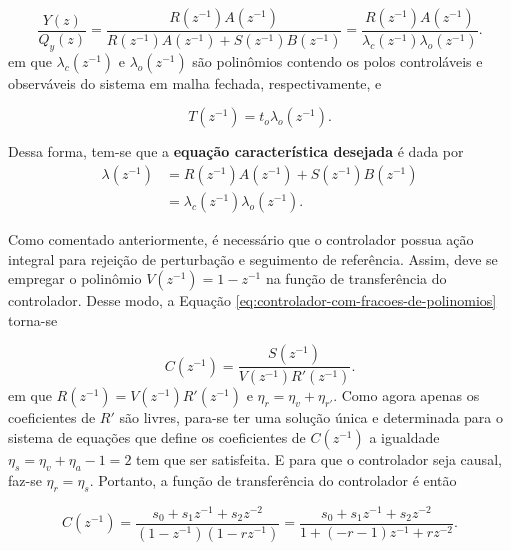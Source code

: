 \begin{equation}
    \label{eq:ft-da-saida-para-perturbacao-na-saida}
    \frac{Y(z)}{Q_{y}(z)} = \frac{R(z^{-1})A(z^{-1})}
                                 {R(z^{-1})A(z^{-1})+S(z^{-1})B(z^{-1})}
                          = \frac{R(z^{-1})A(z^{-1})}
                                 {\lambda_{c}(z^{-1})\lambda_{o}(z^{-1})}.
\end{equation} em que $\lambda_{c}(z^{-1})$ e $\lambda_{o}(z^{-1})$ são polinômios
contendo os polos controláveis e observáveis do sistema em malha fechada,
respectivamente, e 

\begin{equation}
    \label{eq:numerador-do-filtro-de-referencia}
    T(z^{-1}) = t_{o}\lambda_{o}(z^{-1}).
\end{equation}

Dessa forma, tem-se que a \textbf{equação característica desejada} é dada por
\begin{equation}
    \label{eq:equacao-caracteristica-sem-coeficientes}
    \begin{split}
        \lambda(z^{-1}) &= R(z^{-1})A(z^{-1})+S(z^{-1})B(z^{-1}) \\
                        &= \lambda_{c}(z^{-1})\lambda_{o}(z^{-1}).
    \end{split}
\end{equation}

Como comentado anteriormente, é necessário que o controlador possua ação
integral para rejeição de perturbação e seguimento de referência. Assim, deve se
empregar o polinômio $V(z^{-1}) = 1 - z^{-1}$ na função de transferência do
controlador. Desse modo, a Equação
\ref{eq:controlador-com-fracoes-de-polinomios} torna-se

\begin{equation}
    \label{eq:controlador-com-fracoes-de-polinomios-com-integrador}
    C(z^{-1}) = \frac{S(z^{-1})}{V(z^{-1})R'(z^{-1})}.
\end{equation} em que $R(z^{-1}) = V(z^{-1})R'(z^{-1})$ e
$\eta_r = \eta_v + \eta_{r'}$. Como agora apenas os coeficientes de $R'$ são
livres, para-se ter uma solução única e determinada para o sistema de equações
que define os coeficientes de $C(z^{-1})$ a igualdade $\eta_s = \eta_v + \eta_a
- 1 = 2$ tem que ser satisfeita. E para que o controlador seja causal, faz-se
$\eta_r = \eta_s$. Portanto, a função de transferência do controlador é então

\begin{equation}
    C(z^{-1}) = \frac{s_0+s_1z^{-1}+s_2z^{-2}}{(1-z^{-1})(1-rz^{-1})} 
              = \frac{s_0+s_1z^{-1}+s_2z^{-2}}{1+(-r-1)z^{-1}+rz^{-2}}.
\end{equation}

